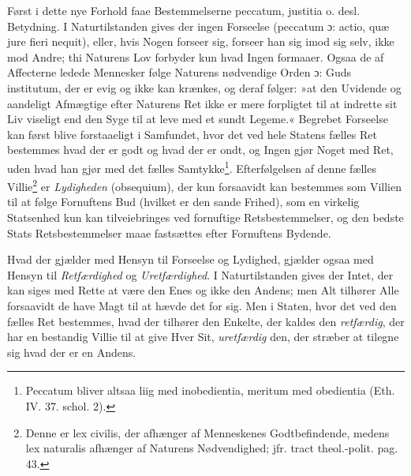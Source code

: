\documentclass[12pt,a4paper]{book}
\newcommand{\opage}[1]{\marginnote{\footnotesize\textit{[#1]}}}
\begin{document}
\opage{138} %
\setcounter{footnote}{0}%
Først i dette nye Forhold faae Bestemmelserne peccatum, justitia o. desl. Betydning. I Naturtilstanden gives der ingen Forseelse (peccatum ɔ: actio, quæ jure fieri nequit), eller, hvis Nogen forseer sig, forseer han sig imod sig selv, ikke mod Andre; thi Naturens Lov forbyder kun hvad Ingen formaaer. Ogsaa de af Affecterne ledede Mennesker følge Naturens nødvendige Orden ɔ: Guds institutum, der er evig og ikke kan krænkes, og deraf følger: »at den Uvidende og aandeligt Afmægtige efter Naturens Ret ikke er mere forpligtet til at indrette sit Liv viseligt end den Syge til at leve med et sundt Legeme.« Begrebet Forseelse kan først blive forstaaeligt i Samfundet, hvor det ved hele Statens fælles Ret bestemmes hvad der er godt og hvad der er ondt, og Ingen gjør Noget med Ret, uden hvad han gjør med det fælles Samtykke\footnote{Peccatum bliver altsaa liig med inobedientia, meritum med obedientia (Eth. IV. 37. schol. 2).}. Efterfølgelsen af denne fælles Villie\footnote{Denne er lex civilis, der afhænger af Menneskenes Godtbefindende, medens lex naturalis afhænger af Naturens Nødvendighed; jfr. tract theol.-polit. pag. 43.} er \emph{Lydigheden} (obsequium), der kun forsaavidt kan bestemmes som Villien til at følge Fornuftens Bud (hvilket er den sande Frihed), som en virkelig Statsenhed kun kan tilveiebringes ved fornuftige Retsbestemmelser, og den bedste Stats Retsbestemmelser maae fastsættes efter Fornuftens Bydende.

Hvad der gjælder med Hensyn til Forseelse og Lydighed, gjælder ogsaa med Hensyn til \emph{Retfærdighed} og \emph{Uretfærdighed}. I Naturtilstanden gives der Intet, der kan siges med Rette at være den Enes og ikke den Andens; men Alt tilhører Alle forsaavidt de have Magt til at hævde det for sig. Men i Staten, hvor det ved den fælles Ret bestemmes, hvad der tilhører den Enkelte, der kaldes den \emph{retfærdig}, der har en bestandig Villie til at give Hver Sit, \emph{uretfærdig} den, der stræber at tilegne sig hvad der er en Andens.
\end{document}
